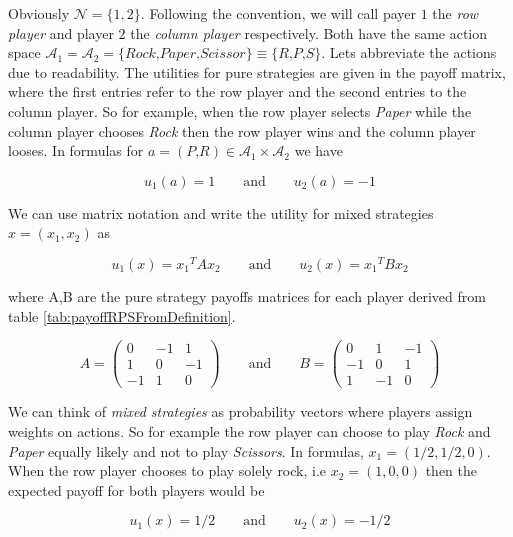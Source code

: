 Obviously $\mathcal{N} = \{1,2\}$. Following the convention, we will call payer $1$ the \textit{row player} and player $2$ the \textit{column player} respectively. Both have the same action space $\mathcal{A}_1 = \mathcal{A}_2 = \{\textit{Rock,Paper,Scissor}\} \equiv \{\textit{R,P,S\}}$. Lets abbreviate the actions due to readability. The utilities for pure strategies are given in the payoff matrix, where the first entries refer to the row player and the second entries to the column player. So for example, when the row player selects \textit{Paper} while the column player chooses \textit{Rock} then the row player wins and the column player looses. In formulas for $a = (\textit{P,R}) \in \mathcal{A}_1 \times \mathcal{A}_2$ we have

\begin{equation*}
    u_1(a) = 1 \qquad \text{and} \qquad u_2(a) = -1
\end{equation*}

We can use matrix notation and write the utility for mixed strategies $x = (x_1,x_2)$ as

\begin{equation*}
    u_1(x) = x{_1}^{T}Ax_2 \qquad \text{and} \qquad u_2(x) = x{_1}^{T}Bx_2
\end{equation*}

where A,B are the pure strategy payoffs matrices for each player derived from table \ref{tab:payoffRPSFromDefinition}.

\begin{equation*}
A = \begin{pmatrix}
0 & -1 & 1\\
1 & 0 & -1\\
-1 & 1 & 0
\end{pmatrix}
\qquad \text{and} \qquad
B = \begin{pmatrix}
0 & 1 & -1\\
-1 & 0 & 1\\
1 & -1 & 0
\end{pmatrix}
\end{equation*}

We can think of \textit{mixed strategies} as probability vectors where players assign weights on actions. So for example the row player can choose to play \textit{Rock} and \textit{Paper} equally likely and not to play \textit{Scissors}. In formulas, $x_1 = (1/2,1/2,0)$. When the row player chooses to play solely rock, i.e $x_2 = (1,0,0)$ then the expected payoff for both players would be

\begin{equation*}
    u_1(x) = 1/2  \qquad \text{and} \qquad u_2(x) = -1/2
\end{equation*}


